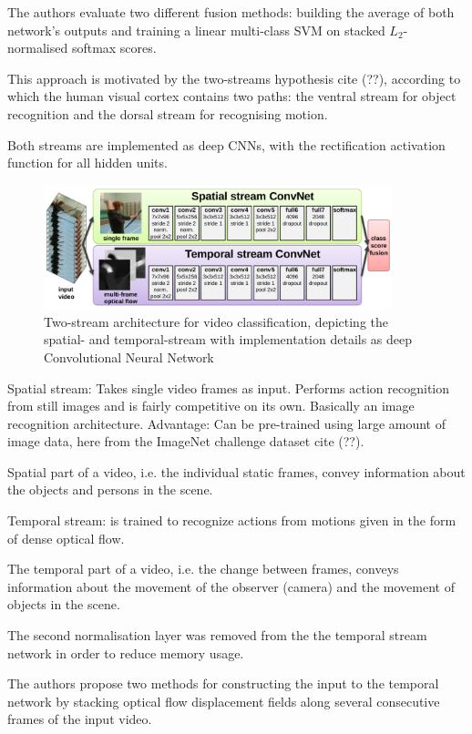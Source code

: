 The authors evaluate two different fusion methods: building the average of both network's outputs and training a linear multi-class SVM on stacked $L_2$-normalised softmax scores.

This approach is motivated by the two-streams hypothesis cite (??), according to which the human visual cortex contains two paths: the ventral stream for object recognition and the dorsal stream for recognising motion.

Both streams are implemented as deep CNNs, with the rectification activation function for all hidden units.

\begin{figure}[H]
    \centering
    \includegraphics[width=0.9\textwidth]{img_deep/twostream_architecture}
    \caption{Two-stream architecture for video classification, depicting the spatial- and temporal-stream with implementation details as deep Convolutional Neural Network \cite{simonyan_two-stream_2014}}
    \label{fig:twostream_architecture}
\end{figure}

Spatial stream: Takes single video frames as input. Performs action recognition from still images and is fairly competitive on its own. Basically an image recognition architecture. Advantage: Can be pre-trained using large amount of image data, here from the ImageNet challenge dataset cite (??).

Spatial part of a video, i.e. the individual static frames, convey information about the objects and persons in the scene.

Temporal stream: is trained to recognize actions from motions given in the form of dense optical flow.

The temporal part of a video, i.e. the change between frames, conveys information about the movement of the observer (camera) and the movement of objects in the scene.

The second normalisation layer was removed from the the temporal stream network in order to reduce memory usage.

The authors propose two methods for constructing the input to the temporal network by stacking optical flow displacement fields along several consecutive frames of the input video.

